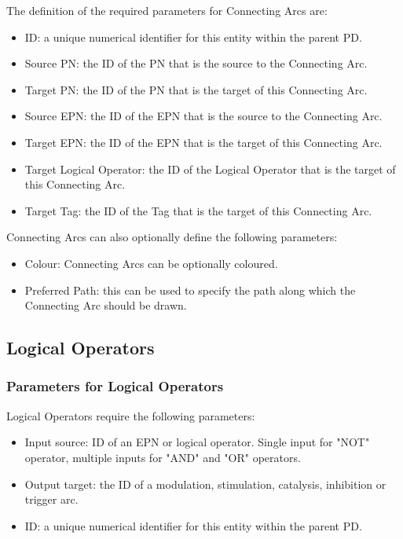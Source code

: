 \documentclass[11pt]{article}
\begin{document}
The definition of the required parameters for Connecting Arcs are:

\begin{itemize}
\item ID: a unique numerical identifier for this entity within the parent PD.
\item Source PN: the ID of the PN that is the source to the Connecting Arc.
\item Target PN: the ID of the PN that is the target of this Connecting Arc.
\item Source EPN: the ID of the EPN that is the source to the Connecting Arc.
\item Target EPN: the ID of the EPN that is the target of this Connecting Arc.
\item Target Logical Operator: the ID of the Logical Operator that is the target of this Connecting Arc.
\item Target Tag: the ID of the Tag that is the target of this Connecting Arc.
\end{itemize}

Connecting Arcs can also optionally define the following parameters:
\begin{itemize}
\item Colour: Connecting Arcs can be optionally coloured.
\item Preferred Path: this can be used to specify the path along which the Connecting Arc should be drawn.
\end{itemize}

\subsection{Logical Operators}
\label{logical_params}

\subsubsection{Parameters for Logical Operators}

Logical Operators require the following parameters:

\begin{itemize}
\item Input source: ID of an EPN or logical operator.  Single input for "NOT" operator, multiple inputs for "AND" and "OR" operators.
\item Output target: the ID of a modulation, stimulation, catalysis, inhibition or trigger arc.
\item ID: a unique numerical identifier for this entity within the parent PD.
\end{itemize}
\end{document}
